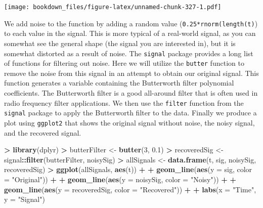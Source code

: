 \documentclass[
]{krantz}
\makeatletter
\newenvironment{Shaded}{\begin{snugshade}}{\end{snugshade}}
\newcommand{\DataTypeTok}[1]{\textcolor[rgb]{0.27,0.27,0.27}{#1}}
\newcommand{\DecValTok}[1]{\textcolor[rgb]{0.06,0.06,0.06}{#1}}
\newcommand{\FloatTok}[1]{\textcolor[rgb]{0.06,0.06,0.06}{#1}}
\newcommand{\KeywordTok}[1]{\textcolor[rgb]{0.27,0.27,0.27}{\textbf{#1}}}
\newcommand{\NormalTok}[1]{#1}
\newcommand{\OperatorTok}[1]{\textcolor[rgb]{0.43,0.43,0.43}{\textbf{#1}}}
\newcommand{\StringTok}[1]{\textcolor[rgb]{0.5,0.5,0.5}{#1}}
\newenvironment{kframe}{%
\medskip{}
\setlength{\fboxsep}{.8em}
 \def\at@end@of@kframe{}%
 \ifinner\ifhmode%
  \def\at@end@of@kframe{\end{minipage}}%
  \begin{minipage}{\columnwidth}%
 \fi\fi%
 \def\FrameCommand##1{\hskip\@totalleftmargin \hskip-\fboxsep
 \colorbox{shadecolor}{##1}\hskip-\fboxsep
     \hskip-\linewidth \hskip-\@totalleftmargin \hskip\columnwidth}%
 \MakeFramed {\advance\hsize-\width
   \@totalleftmargin\z@ \linewidth\hsize
   \@setminipage}}%
 {\par\unskip\endMakeFramed%
 \at@end@of@kframe}
\renewenvironment{Shaded}{\begin{kframe}}{\end{kframe}}
\makeatother
\begin{document}
\texttt{[image: bookdown\_files/figure-latex/unnamed-chunk-327-1.pdf]}

We add noise to the function by adding a random value (\texttt{0.25*rnorm(length(t)}) to each value in the signal. This is more typical of a real-world signal, as you can somewhat see the general shape (the signal you are interested in), but it is somewhat distorted as a result of noise. The \texttt{signal} package provides a long list of functions for filtering out noise. Here we will utilize the \texttt{butter} function to remove the noise from this signal in an attempt to obtain our original signal. This function generates a variable containing the Butterworth filter polynomial coefficients. The Butterworth filter is a good all-around filter that is often used in radio frequency filter applications. We then use the \texttt{filter} function from the \texttt{signal} package to apply the Butterworth filter to the data. Finally we produce a plot using \texttt{ggplot2} that shows the original signal without noise, the noisy signal, and the recovered signal.

\begin{Shaded}
\begin{Highlighting}[]
\OperatorTok{\textgreater{}}\StringTok{ }\KeywordTok{library}\NormalTok{(dplyr)}
\OperatorTok{\textgreater{}}\StringTok{ }\NormalTok{butterFilter \textless{}{-}}\StringTok{ }\KeywordTok{butter}\NormalTok{(}\DecValTok{3}\NormalTok{, }\FloatTok{0.1}\NormalTok{)}
\OperatorTok{\textgreater{}}\StringTok{ }\NormalTok{recoveredSig \textless{}{-}}\StringTok{ }\NormalTok{signal}\OperatorTok{::}\KeywordTok{filter}\NormalTok{(butterFilter, noisySig)}
\OperatorTok{\textgreater{}}\StringTok{ }\NormalTok{allSignals \textless{}{-}}\StringTok{ }\KeywordTok{data.frame}\NormalTok{(t, sig, noisySig, recoveredSig)}
\OperatorTok{\textgreater{}}\StringTok{ }\KeywordTok{ggplot}\NormalTok{(allSignals, }\KeywordTok{aes}\NormalTok{(t)) }\OperatorTok{+}\StringTok{ }
\OperatorTok{+}\StringTok{   }\KeywordTok{geom\_line}\NormalTok{(}\KeywordTok{aes}\NormalTok{(}\DataTypeTok{y =}\NormalTok{ sig, }\DataTypeTok{color =} \StringTok{"Original"}\NormalTok{)) }\OperatorTok{+}\StringTok{ }
\OperatorTok{+}\StringTok{   }\KeywordTok{geom\_line}\NormalTok{(}\KeywordTok{aes}\NormalTok{(}\DataTypeTok{y =}\NormalTok{ noisySig, }\DataTypeTok{color =} \StringTok{"Noisy"}\NormalTok{)) }\OperatorTok{+}\StringTok{ }
\OperatorTok{+}\StringTok{   }\KeywordTok{geom\_line}\NormalTok{(}\KeywordTok{aes}\NormalTok{(}\DataTypeTok{y =}\NormalTok{ recoveredSig, }\DataTypeTok{color =} \StringTok{"Recovered"}\NormalTok{)) }\OperatorTok{+}\StringTok{ }
\OperatorTok{+}\StringTok{   }\KeywordTok{labs}\NormalTok{(}\DataTypeTok{x =} \StringTok{"Time"}\NormalTok{, }\DataTypeTok{y =} \StringTok{"Signal"}\NormalTok{)}
\end{Highlighting}
\end{Shaded}
\end{document}
